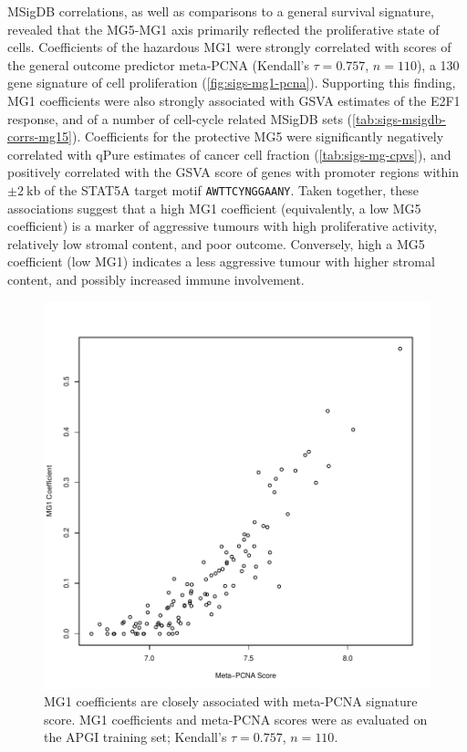 \documentclass[dissertation.tex]{subfiles}
\begin{document}
\gls{MSigDB} correlations, as well as comparisons to a general survival signature, revealed that the MG5-MG1 axis primarily reflected the proliferative state of cells.  Coefficients of the hazardous MG1 were strongly correlated with scores of the general outcome predictor meta-PCNA (Kendall's $\tau = 0.757$, $n = 110$), a 130 gene signature of cell proliferation \cite{Venet2011} (\cref{fig:sigs-mg1-pcna}).  Supporting this finding, MG1 coefficients were also strongly associated with \gls{GSVA} estimates of the E2F1 response, and of a number of cell-cycle related \gls{MSigDB} sets (\cref{tab:sigs-msigdb-corrs-mg15}).  Coefficients for the protective MG5 were significantly negatively correlated with qPure estimates of cancer cell fraction \cite{Song2012} (\cref{tab:sigs-mg-cpvs}), and positively correlated with the \gls{GSVA} score of genes with promoter regions within $\pm 2\ \text{kb}$ of the STAT5A target motif \texttt{AWTTCYNGGAANY}.  Taken together, these associations suggest that a high MG1 coefficient (equivalently, a low MG5 coefficient) is a marker of aggressive tumours with high proliferative activity, relatively low stromal content, and poor outcome.  Conversely, high a MG5 coefficient (low MG1) indicates a less aggressive tumour with higher stromal content, and possibly increased immune involvement.

\begin{figure}
\centering
\includegraphics[width=.7\linewidth]{analysis/biosurv/reports/18_SIS_diag_dsd_final/figure/metagene-pairs-7}
\caption{MG1 coefficients are closely associated with meta-PCNA signature score.  MG1 coefficients and meta-PCNA \cite{Venet2011} scores were as evaluated on the \gls{APGI} training set; Kendall's $\tau = 0.757$, $n = 110$.\label{fig:sigs-nmf-corplots}}
\end{figure}
\end{document}
